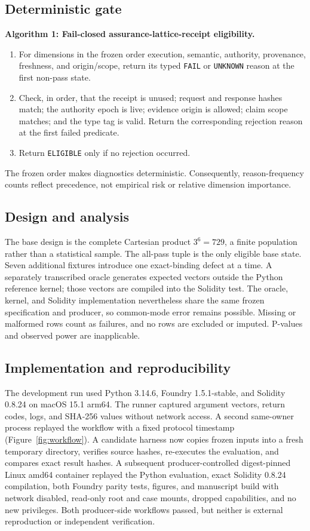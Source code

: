 \documentclass[utf8]{FrontiersinHarvard}
\begin{document}
\subsection{Deterministic gate}

\noindent\textbf{Algorithm 1: Fail-closed assurance-lattice-receipt eligibility.}
\begin{enumerate}
\item For dimensions in the frozen order execution, semantic, authority, provenance, freshness, and origin/scope, return its typed \texttt{FAIL} or \texttt{UNKNOWN} reason at the first non-pass state.
\item Check, in order, that the receipt is unused; request and response hashes match; the authority epoch is live; evidence origin is allowed; claim scope matches; and the type tag is valid. Return the corresponding rejection reason at the first failed predicate.
\item Return \texttt{ELIGIBLE} only if no rejection occurred.
\end{enumerate}
The frozen order makes diagnostics deterministic. Consequently, reason-frequency counts reflect precedence, not empirical risk or relative dimension importance.

\subsection{Design and analysis}

The base design is the complete Cartesian product $3^6=729$, a finite population rather than a statistical sample. The all-pass tuple is the only eligible base state. Seven additional fixtures introduce one exact-binding defect at a time. A separately transcribed oracle generates expected vectors outside the Python reference kernel; those vectors are compiled into the Solidity test. The oracle, kernel, and Solidity implementation nevertheless share the same frozen specification and producer, so common-mode error remains possible. Missing or malformed rows count as failures, and no rows are excluded or imputed. P-values and observed power are inapplicable.

\subsection{Implementation and reproducibility}

The development run used Python 3.14.6, Foundry 1.5.1-stable, and Solidity 0.8.24 on macOS 15.1 arm64. The runner captured argument vectors, return codes, logs, and SHA-256 values without network access. A second same-owner process replayed the workflow with a fixed protocol timestamp (Figure~\ref{fig:workflow}). A candidate harness now copies frozen inputs into a fresh temporary directory, verifies source hashes, re-executes the evaluation, and compares exact result hashes. A subsequent producer-controlled digest-pinned Linux amd64 container replayed the Python evaluation, exact Solidity 0.8.24 compilation, both Foundry parity tests, figures, and manuscript build with network disabled, read-only root and case mounts, dropped capabilities, and no new privileges. Both producer-side workflows passed, but neither is external reproduction or independent verification.
\end{document}
